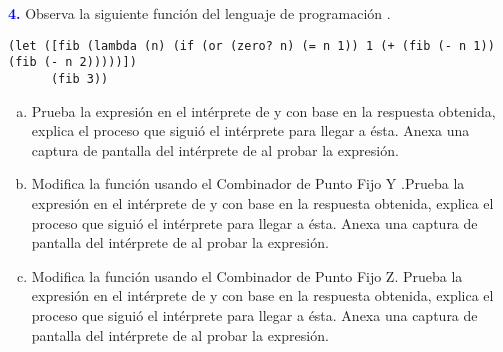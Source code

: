 \Large\textbf{\textcolor{blue}{4.}}
Observa la siguiente función del lenguaje de programación .

\begin{lstlisting}
(let ([fib (lambda (n) (if (or (zero? n) (= n 1)) 1 (+ (fib (- n 1)) (fib (- n 2)))))])
      (fib 3))
\end{lstlisting}

\begin{enumerate}[a.]
\item Prueba la expresión en el intérprete de  y con base en la respuesta 
obtenida, explica el proceso que siguió el intérprete para llegar a ésta. Anexa una 
captura de pantalla del intérprete de  al probar la expresión.
\item Modifica la función usando el Combinador de Punto Fijo Y .Prueba la expresión en 
el intérprete de  y con base en la respuesta obtenida, explica el proceso que 
siguió el intérprete para llegar a ésta. Anexa una captura de pantalla del intérprete 
de  al probar la expresión.
\item Modifica la función usando el Combinador de Punto Fijo Z. Prueba la expresión en 
el intérprete de  y con base en la respuesta obtenida, explica el proceso que 
siguió el intérprete para llegar a ésta. Anexa una captura de pantalla del intérprete 
de  al probar la expresión.
\end{enumerate}